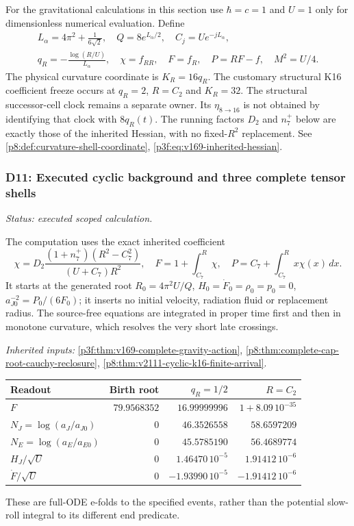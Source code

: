 \documentclass[12pt,a4paper]{article}
\begin{document}
For the gravitational calculations in this section use $\hbar=c=1$ and
$U=1$ only for dimensionless numerical evaluation. Define
\begin{gather*}
 L_\alpha=4\pi^2+\frac{1}{6\sqrt2},\quad Q=8e^{L_\alpha/2},\quad
 C_j=Ue^{-jL_\alpha},\\
 q_R=-\frac{\log(R/U)}{L_\alpha},\quad
 \chi=f_{RR},\quad F=f_R,\quad P=RF-f,\quad M^2=U/4.
\end{gather*}
The physical curvature coordinate is $K_R=16q_R$. The customary
structural K16 coefficient freeze occurs at $q_R=2$, $R=C_2$ and
$K_R=32$. The structural successor-cell clock remains a separate owner.
Its $\eta_{8\to16}$ is not obtained by identifying that clock with
$8q_R(t)$. The running factors $D_2$ and $n_7^+$ below are exactly those
of the inherited Hessian, with no fixed-$R^2$ replacement.
See \ref{p8:def:curvature-shell-coordinate}, \ref{p3f:eq:v169-inherited-hessian}.

\subsubsection{D11: Executed cyclic background and three complete tensor shells}
\label{p8:sec:v2201-derived-d11}
\noindent\textit{Status: executed scoped calculation.}

The computation uses the exact inherited coefficient
\[
 \chi=D_2\frac{(1+n_7^+)(R^2-C_7^2)}{(U+C_7)R^2},\quad
 F=1+\int_{C_7}^R\chi,\quad P=C_7+\int_{C_7}^R x\chi(x)\,dx.
\]
It starts at the generated root
$R_0=4\pi^2U/Q$, $H_0=\dot F_0=\rho_0=p_0=0$,
$a_{J0}^{-2}=P_0/(6F_0)$; it inserts no initial velocity, radiation fluid
or replacement radius. The source-free equations are integrated in proper
time first and then in monotone curvature, which resolves the very short
late crossings.
\par\noindent\textit{Inherited inputs:} \ref{p3f:thm:v169-complete-gravity-action}, \ref{p8:thm:complete-cap-root-cauchy-reclosure}, \ref{p8:thm:v2111-cyclic-k16-finite-arrival}.

\begin{center}\small
\begin{tabular}{@{}lrrr@{}}\toprule
Readout & Birth root & $q_R=1/2$ & $R=C_2$\\\midrule
$F$ & $79.9568352$ & $16.99999996$ & $1+8.09\,10^{-35}$\\
$N_J=\log(a_J/a_{J0})$ & $0$ & $46.3526558$ & $58.6597209$\\
$N_E=\log(a_E/a_{E0})$ & $0$ & $45.5785190$ & $56.4689774$\\
$H_J/\sqrt U$ & $0$ & $1.46470\,10^{-5}$ & $1.91412\,10^{-6}$\\
$\dot F/\sqrt U$ & $0$ & $-1.93990\,10^{-5}$ & $-1.91412\,10^{-6}$\\
\bottomrule\end{tabular}
\end{center}
These are full-ODE e-folds to the specified events, rather than the
potential slow-roll integral to its different end predicate.
\end{document}
